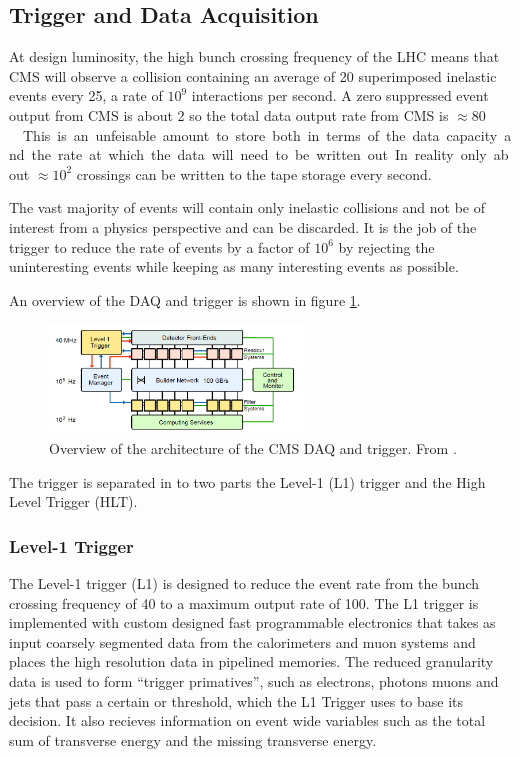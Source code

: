\subsection{Trigger and Data Acquisition}
At design luminosity, the high bunch crossing frequency of the LHC means that
CMS will observe a collision containing an average of 20 superimposed inelastic
events every \unit{25}{\nano\second}, a rate of $10^{9}$ interactions per
second.
A zero suppressed event output from CMS is about \unit{2}{\mega \bel} so the total data
output rate from CMS is \unit{$\approx 80$}{\tera \bel \per \second}
This is an unfeisable amount to store both in terms of the data capacity and the
rate at which the data will need to be written out.
In reality only about $\approx 10^{2}$ crossings can be written to the tape
storage every second. 

The vast majority of events will contain only inelastic collisions and not be of
interest from a physics perspective and can be discarded.  
It is the job of the trigger to reduce the rate of events
by a factor of $10^6$ by rejecting the uninteresting events while keeping as
many interesting events as possible.

An overview of the DAQ and trigger is shown in figure \ref{fig:CMSDAQ}.

\begin{figure}[htp]
  \centering
  \includegraphics[width=0.6\textwidth]{CMSDAQ}
  \caption{Overview of the architecture of the CMS DAQ and trigger. From
  \label{fig:CMSDAQ}
\cite{cms}.}
\end{figure}

The trigger is separated in to two parts the Level-1 (L1) trigger and the High
Level Trigger (HLT).\cite{cms}

\subsubsection{Level-1 Trigger}

The Level-1 trigger (L1) is designed to reduce the event rate from the bunch
crossing frequency of \unit{40}{\mega\hertz} to a maximum output rate of
\unit{100}{\kilo\hertz}.
The L1 trigger is implemented with custom designed fast programmable electronics
 that takes as input coarsely segmented data from the calorimeters and muon systems and
places the high resolution data in pipelined memories. The reduced granularity
data is used to form ``trigger primatives'', such as electrons, photons muons
and jets that pass a certain \PT or \ET threshold, which the L1 Trigger uses to
base its decision. It also recieves information on event wide variables such as
the total sum of transverse energy and the missing transverse energy.


